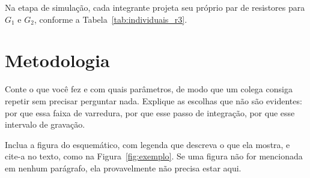 \documentclass[11pt,a4paper]{article}
\begin{document}
Na etapa de simulação, cada integrante projeta seu próprio par de resistores para $G_1$ e $G_2$, conforme a Tabela~\ref{tab:individuais_r3}.

\begin{table}[htbp]
    \centering
    \caption{Dimensionamento dos resistores e ganhos para cada integrante.}
    \label{tab:resistores_integrantes}
\end{table}

\section{Metodologia}

Conte o que você fez e com quais parâmetros, de modo que um colega consiga repetir sem
precisar perguntar nada. Explique as escolhas que não são evidentes: por que essa faixa de
varredura, por que esse passo de integração, por que esse intervalo de gravação.

Inclua a figura do esquemático, com legenda que descreva o que ela mostra, e cite-a no
texto, como na Figura~\ref{fig:exemplo}. Se uma figura não for mencionada em nenhum
parágrafo, ela provavelmente não precisa estar aqui.
\end{document}
